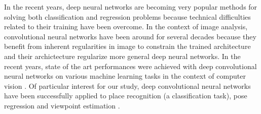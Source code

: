 In the recent years, deep neural networks are becoming very popular methods for solving both classification and regression problems because technical difficulties related to their training have been overcome. In the context of image analysis, convolutional neural networks have been around for several decades because they benefit from inherent regularities in image to constrain the trained architecture and their archictecture regularize more general deep neural networks. In the recent years, state of the art performances were achieved with deep convolutional neural networks on various machine learning tasks in the context of computer vision \cite{NIPS2012_4824,Simonyan14c}. Of particular interest for our study, deep convolutional neural networks have been successfully applied to place recognition \cite{Sunderhauf2015} (a classification task), pose regression \cite{conf/accv/PfisterSCZ14} and viewpoint estimation \cite{Su2015}.


